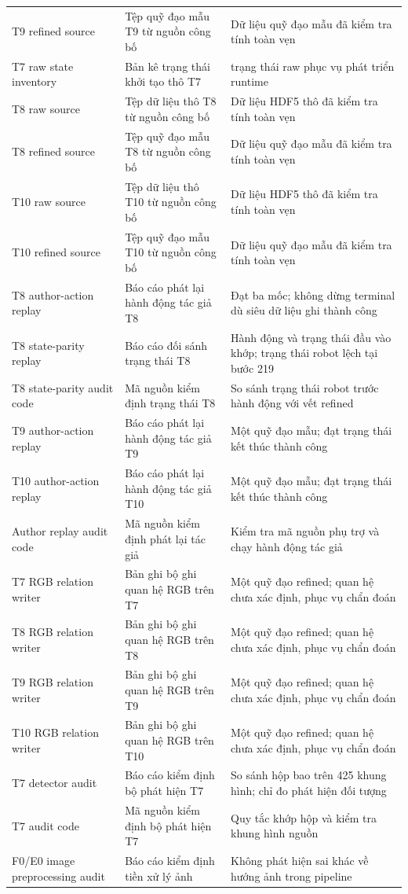\begin{longtable}{>{\raggedright\arraybackslash}p{}|>{\raggedright\arraybackslash}p{}|>{\raggedright\arraybackslash}p{}}
T9 refined source & Tệp quỹ đạo mẫu T9 từ nguồn công bố & Dữ liệu quỹ đạo mẫu đã kiểm tra tính toàn vẹn \\
T7 raw state inventory & Bản kê trạng thái khởi tạo thô T7 & 120 trạng thái raw phục vụ phát triển runtime \\
T8 raw source & Tệp dữ liệu thô T8 từ nguồn công bố & Dữ liệu HDF5 thô đã kiểm tra tính toàn vẹn \\
T8 refined source & Tệp quỹ đạo mẫu T8 từ nguồn công bố & Dữ liệu quỹ đạo mẫu đã kiểm tra tính toàn vẹn \\
T10 raw source & Tệp dữ liệu thô T10 từ nguồn công bố & Dữ liệu HDF5 thô đã kiểm tra tính toàn vẹn \\
T10 refined source & Tệp quỹ đạo mẫu T10 từ nguồn công bố & Dữ liệu quỹ đạo mẫu đã kiểm tra tính toàn vẹn \\
T8 author-action replay & Báo cáo phát lại hành động tác giả T8 & Đạt ba mốc; không dừng terminal dù siêu dữ liệu ghi thành công \\
T8 state-parity replay & Báo cáo đối sánh trạng thái T8 & Hành động và trạng thái đầu vào khớp; trạng thái robot lệch tại bước 219 \\
T8 state-parity audit code & Mã nguồn kiểm định trạng thái T8 & So sánh trạng thái robot trước hành động với vết refined \\
T9 author-action replay & Báo cáo phát lại hành động tác giả T9 & Một quỹ đạo mẫu; đạt trạng thái kết thúc thành công \\
T10 author-action replay & Báo cáo phát lại hành động tác giả T10 & Một quỹ đạo mẫu; đạt trạng thái kết thúc thành công \\
Author replay audit code & Mã nguồn kiểm định phát lại tác giả & Kiểm tra mã nguồn phụ trợ và chạy hành động tác giả \\
T7 RGB relation writer & Bản ghi bộ ghi quan hệ RGB trên T7 & Một quỹ đạo refined; quan hệ chưa xác định, phục vụ chẩn đoán \\
T8 RGB relation writer & Bản ghi bộ ghi quan hệ RGB trên T8 & Một quỹ đạo refined; quan hệ chưa xác định, phục vụ chẩn đoán \\
T9 RGB relation writer & Bản ghi bộ ghi quan hệ RGB trên T9 & Một quỹ đạo refined; quan hệ chưa xác định, phục vụ chẩn đoán \\
T10 RGB relation writer & Bản ghi bộ ghi quan hệ RGB trên T10 & Một quỹ đạo refined; quan hệ chưa xác định, phục vụ chẩn đoán \\
T7 detector audit & Báo cáo kiểm định bộ phát hiện T7 & So sánh hộp bao trên 425 khung hình; chỉ đo phát hiện đối tượng \\
T7 audit code & Mã nguồn kiểm định bộ phát hiện T7 & Quy tắc khớp hộp và kiểm tra khung hình nguồn \\
F0/E0 image preprocessing audit & Báo cáo kiểm định tiền xử lý ảnh & Không phát hiện sai khác về hướng ảnh trong pipeline \\
\end{longtable}
\endgroup

